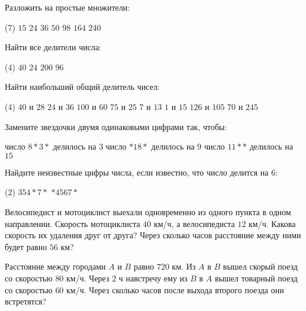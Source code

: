 \begin{class}[number=3]
	\begin{listofex}
	\item Разложить на простые множители:
	\begin{tasks}(7)
		\task \( 15 \)
		\task \( 24 \)
		\task \( 36 \)
		\task \( 50 \)
		\task \( 98 \)
		\task \( 164 \)
		\task \( 240 \)
	\end{tasks}
	\item Найти все делители числа:
	\begin{tasks}(4)
		\task\( 40 \)
		\task \( 24 \)
		\task \( 200 \)
		\task \( 96 \)
	\end{tasks}
	\item Найти наибольший общий делитель чисел:
	\begin{tasks}(4)
		\task \( 40 \) и \( 28 \)
		\task \( 24 \) и \( 36 \)
		\task \( 100 \) и \( 60 \)
		\task \( 75 \) и \( 25 \)
		\task \( 7 \) и \( 13 \)
		\task \( 1 \) и \( 15 \)
		\task \( 126 \) и \( 105 \)
		\task \( 70 \) и \( 245 \)
	\end{tasks}
	\item Замените звездочки двумя одинаковыми цифрами так, чтобы:
	\begin{tasks}
		\task число \( 8*3* \) делилось на \( 3 \)
		\task число \( *18* \) делилось на \( 9 \)
		\task число \( 11** \) делилось на \( 15 \)
	\end{tasks}
	\item Найдите неизвестные цифры числа, если известно, что число делится на \( 6 \):
	\begin{tasks}(2)
		\task \( 354*7* \)
		\task \( *4567* \)
	\end{tasks}
	\item Велосипедист и мотоциклист выехали одновременно из одного пункта в одном направлении. Скорость мотоциклиста \( 40 \) км/ч, а велосипедиста \( 12 \) км/ч. Какова скорость их удаления друг от друга? Через сколько часов расстояние между ними будет равно \( 56 \) км?
	\item Расстояние между городами \( A \) и \( B \) равно \( 720 \) км. Из \( A \) в \( B \) вышел скорый поезд со скоростью \( 80 \) км/ч. Через \( 2 \) ч навстречу ему из \( B \) в \( A \) вышел товарный поезд со скоростью \( 60 \) км/ч. Через сколько часов после выхода второго поезда они встретятся?
	\end{listofex}
\end{class}

